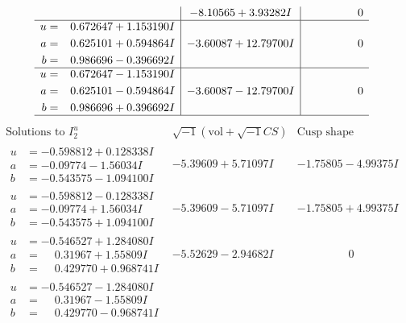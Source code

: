 \documentclass[1p]{elsarticle_modified}
\theoremstyle{definition}
\newcommand{\I}{\sqrt{-1}}
\begin{document}
$$\begin{array}{c|c|c}
 & -8.10565 + 3.93282 I & \phantom{-0.000000 } 0 \\ \hline\begin{aligned}
u &= \phantom{-}0.672647 + 1.153190 I \\
a &= \phantom{-}0.625101 + 0.594864 I \\
b &= \phantom{-}0.986696 - 0.396692 I\end{aligned}
 & -3.60087 + 12.79700 I & \phantom{-0.000000 } 0 \\ \hline\begin{aligned}
u &= \phantom{-}0.672647 - 1.153190 I \\
a &= \phantom{-}0.625101 - 0.594864 I \\
b &= \phantom{-}0.986696 + 0.396692 I\end{aligned}
 & -3.60087 - 12.79700 I & \phantom{-0.000000 } 0\\
 \hline 
 \end{array}$$\newpage$$\begin{array}{c|c|c}  
\text{Solutions to }I^u_{2}& \I (\text{vol} + \sqrt{-1}CS) & \text{Cusp shape}\\
 \hline 
\begin{aligned}
u &= -0.598812 + 0.128338 I \\
a &= -0.09774 - 1.56034 I \\
b &= -0.543575 - 1.094100 I\end{aligned}
 & -5.39609 + 5.71097 I & -1.75805 - 4.99375 I \\ \hline\begin{aligned}
u &= -0.598812 - 0.128338 I \\
a &= -0.09774 + 1.56034 I \\
b &= -0.543575 + 1.094100 I\end{aligned}
 & -5.39609 - 5.71097 I & -1.75805 + 4.99375 I \\ \hline\begin{aligned}
u &= -0.546527 + 1.284080 I \\
a &= \phantom{-}0.31967 + 1.55809 I \\
b &= \phantom{-}0.429770 + 0.968741 I\end{aligned}
 & -5.52629 - 2.94682 I & \phantom{-0.000000 } 0 \\ \hline\begin{aligned}
u &= -0.546527 - 1.284080 I \\
a &= \phantom{-}0.31967 - 1.55809 I \\
b &= \phantom{-}0.429770 - 0.968741 I\end{aligned}

\end{array}$$
\end{document}
